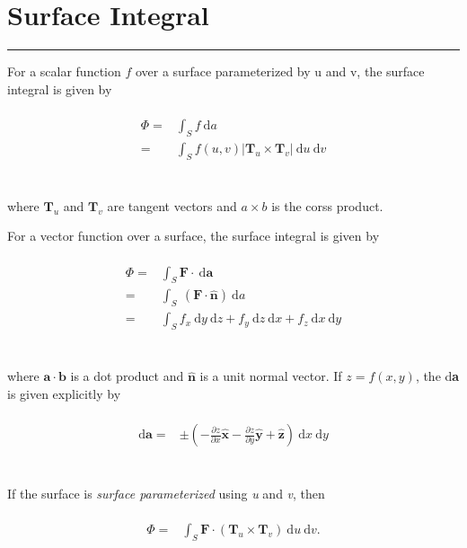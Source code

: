 \documentclass[letterpaper,10pt,fleqn]{article}
\numberwithin{equation}{section}
\newcommand{\D}{\mathrm{d}}
\begin{document}

\section*{Surface Integral}
\addtocounter{section}{1}
\hrule

For a scalar function \(f\) over a surface parameterized by u and v, the surface integral is given by
\\
\\
\begin{align}
  \Phi =& \displaystyle\int_S f \ \! \D a \\
  =& \displaystyle\int_S f(u, v)|\mathbf{T}_u \times \mathbf{T}_v| \ \! \D u \ \! \D v
\end{align}
\\
\\
where \(\mathbf{T}_u\) and \(\mathbf{T}_v\) are tangent vectors and \(a \times b\) is the corss product.

For a vector function over a surface, the surface integral is given by
\\
\\
\begin{align}
  \Phi =& \displaystyle\int_S \mathbf{F} \cdot \ \D \mathbf{a} \\
  =& \displaystyle\int_S \ \! (\mathbf{F} \cdot \mathbf{\hat{n}}) \ \D a \\
  =& \displaystyle\int_S f_x \ \! \D y \ \! \D z + f_y \ \! \D z \ \! \D x + f_z \ \! \D x \ \! \D y
\end{align}
\\
\\
where \(\mathbf{a \cdot b}\) is a dot product and \(\mathbf{\hat{n}}\) is a unit normal vector. If \(z \! = \! f(x, y)\), the d\textbf{a} is given explicitly by
\\
\\
\begin{align}
  \D \mathbf{a} =& \pm \left(-\frac{\partial z}{\partial x}\mathbf{\hat{x}} - \frac{\partial z}{\partial y}\mathbf{\hat{y}} + \mathbf{\hat{z}}\right) \ \! \D x \ \! \D y
\end{align}
\\
\\
If the surface is \emph{surface parameterized} using \emph{u} and \emph{v}, then
\\
\\
\begin{align}
  \Phi =& \displaystyle\int_S \mathbf{F} \cdot (\mathbf{T}_u \times \mathbf{T}_v) \ \D u \ \! \D v.
\end{align}
\\
\\
\end{document}
